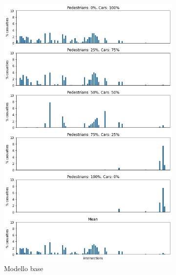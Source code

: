\begin{figure}[ht]
    \centering
    \begin{subfigure}{0.475\textwidth}
        \centering
        \includegraphics[width=\textwidth]{images/analisi/comparison-critical-ints-base.png}
        \caption{Modello base}
        \label{fig:base-ints-casualties}
    \end{subfigure}
    \hfill
    \begin{subfigure}{0.475\textwidth}
        \centering

\end{subfigure}
\end{figure}
